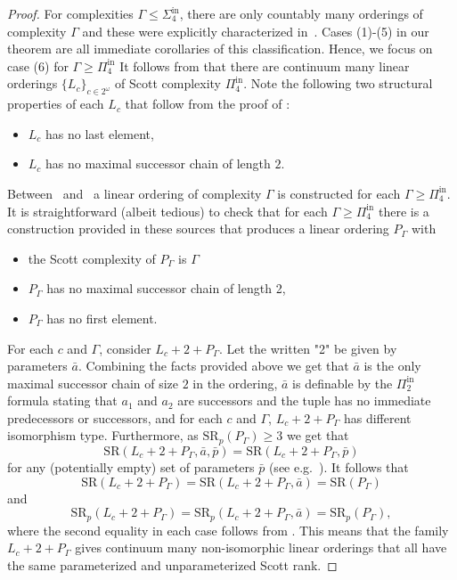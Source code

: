\documentclass[11pt]{amsart}
\newcommand{\SR}{\text{SR}}
\newcommand{\Pinf}[1]{\Pi^{\mathrm{in}}_{#1}}
\newcommand{\Sinf}[1]{\Sigma^{\mathrm{in}}_{#1}}
\theoremstyle{remark}
\begin{document}
\begin{proof}
	For complexities $\Gamma\leq\Sinf{4}$, there are only countably many orderings of complexity $\Gamma$ and these were explicitly characterized in~\cite[Theorem 3.7]{GR23}.
    Cases (1)-(5) in our theorem are all immediate corollaries of this classification.
		Hence, we focus on case (6) for $\Gamma\geq \Pinf{4}$
		It follows from \cite[Proposition 3.11]{GR23} that there are continuum many linear orderings $\{L_c\}_{c\in 2^\omega}$ of Scott complexity $\Pinf{4}$.
		Note the following two structural properties of each $L_c$ that follow from the proof of \cite[Proposition 3.11]{GR23}:
    \begin{itemize}
        \item $L_c$ has no last element,
        \item $L_c$ has no maximal successor chain of length $2$.
    \end{itemize}
		Between~\cite{GR23} and~\cite[Theorem 1.3]{GHTH} a linear ordering of complexity $\Gamma$ is constructed for each $\Gamma\geq \Pinf{4}$.
    It is straightforward (albeit tedious) to check that for each $\Gamma\geq \Pinf{4}$ there is a construction provided in these sources that produces a linear ordering $P_\Gamma$ with
    \begin{itemize}
        \item the Scott complexity of $P_\Gamma$ is $\Gamma$
        \item $P_\Gamma$ has no maximal successor chain of length 2,
        \item $P_\Gamma$ has no first element.
    \end{itemize}
    For each $c$ and $\Gamma$, consider $L_c+2+P_\Gamma$.
    Let the written "2" be given by parameters $\bar{a}$.
		Combining the facts provided above we get that $\bar a$ is the only maximal successor chain of size $2$ in the ordering, $\bar a$ is definable by the $\Pinf{2}$ formula stating that $a_1$ and $a_2$ are successors and the tuple has no immediate predecessors or successors, and for each $c$ and $\Gamma$, $L_c+2+P_{\Gamma}$ has different isomorphism type.
    Furthermore, as $\SR_p(P_\Gamma)\geq 3$ we get that
    \[\SR(L_c+2+P_\Gamma,\bar{a},\bar{p})=\SR(L_c+2+P_\Gamma,\bar{p})\]
    for any (potentially empty) set of parameters $\bar{p}$ (see e.g.~\cite[Table 1]{MBook}).
	It follows that
    \[\SR(L_c+2+P_\Gamma)=\SR(L_c+2+P_\Gamma,\bar{a})=\SR(P_\Gamma)\] and
    \[\SR_p(L_c+2+P_\Gamma)=\SR_p(L_c+2+P_\Gamma,\bar{a})=\SR_p(P_\Gamma),\]
    where the second equality in each case follows from \cite[Lemma 11]{GM23}.
    This means that the family $L_c+2+P_\Gamma$ gives continuum many non-isomorphic linear orderings that all have the same parameterized and unparameterized Scott rank.


\end{proof}
\end{document}
